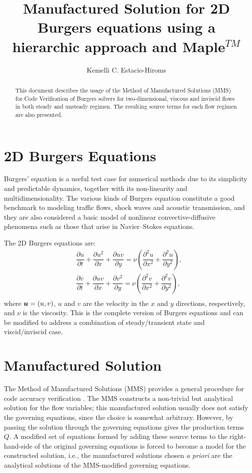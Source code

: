 \documentclass[10pt]{article}
\title{Manufactured Solution for 2D Burgers equations using a hierarchic approach and Maple$^{TM}$}
\author{Kemelli C. Estacio-Hiroms}
\newcommand{\diff}[2] {\dfrac{\partial #1}{\partial #2}}
\newcommand{\bv}[1]{\ensuremath{\mbox{\boldmath$ #1 $}}}
\begin{document}
\maketitle
\tableofcontents


\begin{abstract}
This document describes the usage of the Method of Manufactured Solutions (MMS) for Code Verification of Burgers solvers for two-dimensional, viscous and inviscid flows in both steady and unsteady regimen. The resulting source terms for each flow regimen are also presented.
\end{abstract}


\section{2D Burgers Equations}

Burgers' equation is a useful test case for numerical methods due to its simplicity and predictable dynamics, together with its non-linearity and multidimensionality. The various kinds of Burgers equation constitute a good benchmark to modeling traffic flows, shock waves and acoustic transmission, and they are also considered a basic model of nonlinear convective-diffusive phenomena such as those that arise
in Navier--Stokes equations.



The 2D Burgers  equations are:
\begin{equation}
 \label{eq:burgers2d_01}
\begin{split}
&\diff{ u}{t} + \diff{ u^2 }{x}+\diff{uv}{y}=\nu \left( \diff{^2u}{ x^2}+ \diff{^2u }{y^2}\right),\\
& \diff{ v}{t}+ \diff{ u v}{x} + \diff{  v^2 }{y}=\nu \left( \diff{^2v}{ x^2}+ \diff{^2v }{y^2}\right),\\
\end{split}
\end{equation}
%
where $\bv{u}=(u,v)$,  $u$ and $v$ are the velocity in the  $x$ and $y$  directions, respectively, and $\nu$ is the viscosity. This is the complete version of Burgers equations and can be modified to address a combination of steady/transient state and viscid/inviscid case.

\section{Manufactured Solution}
The Method of Manufactured Solutions (MMS) provides a general procedure for  code accuracy verification \citep{Roache2002,Bond2007}.
The MMS constructs a non-trivial but analytical solution for the flow variables; this manufactured
solution usually does not  satisfy the governing equations, since the choice is somewhat arbitrary. However, by passing the solution through the governing equations gives the production terms $Q$. A modified set of equations formed by adding these source terms to the right-hand-side of the original governing equations is forced to become a model for the constructed solution, i.e., the manufactured solutions chosen \textit{a priori} are the analytical solutions of the MMS-modified governing equations.
\end{document}
